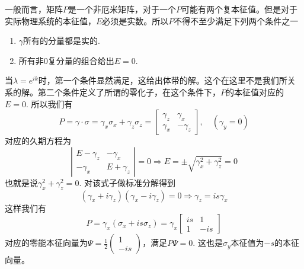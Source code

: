 \documentclass{article}
\numberwithin{equation}{subsection}
\begin{document}
一般而言，矩阵$P$是一个非厄米矩阵，对于一个$P$可能有两个复本征值。但是对于实际物理系统的本征值，$E$必须是实数。所以$P$不得不至少满足下列两个条件之一
\begin{enumerate}
    \item $\gamma$所有的分量都是实的.
    \item 所有非$0$复分量的组合给出$E=0$.
\end{enumerate}
当$\lambda=e^{ik}$时，第一个条件显然满足，这给出体带的解。这个在这里不是我们所关系的解。第二个条件定义了所谓的零化子，在这个条件下，$P$的本征值对应的$E=0$. 所以我们有
\begin{equation}
    P=\gamma\cdot\sigma=\gamma_x\sigma_x+\gamma_z\sigma_z=\begin{bmatrix}
        \gamma_z&\gamma_x\\
        \gamma_x&-\gamma_z
    \end{bmatrix},\quad(\gamma_y=0)
\end{equation}
对应的久期方程为
\begin{equation}
    \left|\begin{matrix}
        E-\gamma_z&-\gamma_x\\
        -\gamma_x&E+\gamma_z
    \end{matrix}\right|=0\Longrightarrow E=\pm\sqrt{\gamma_x^2+\gamma_z^2}=0
\end{equation}
也就是说$\gamma_x^2+\gamma_z^2=0$. 对该式子做标准分解得到
\begin{equation}
    (\gamma_x+i\gamma_z)(\gamma_x-i\gamma_z)=0\Longrightarrow\gamma_z=is\gamma_x
\end{equation}
这样我们有
\begin{equation}
    P=\gamma_x(\sigma_x+is\sigma_z)=\gamma_x\begin{bmatrix}
        is&1\\
        1&-is
    \end{bmatrix}
\end{equation}
对应的零能本征向量为$\Psi=\frac{1}{2}\begin{pmatrix}
    1\\
    -is
\end{pmatrix}$，满足$P\Psi=0$. 这也是$\sigma_y$本征值为$-s$的本征向量。
\end{document}
